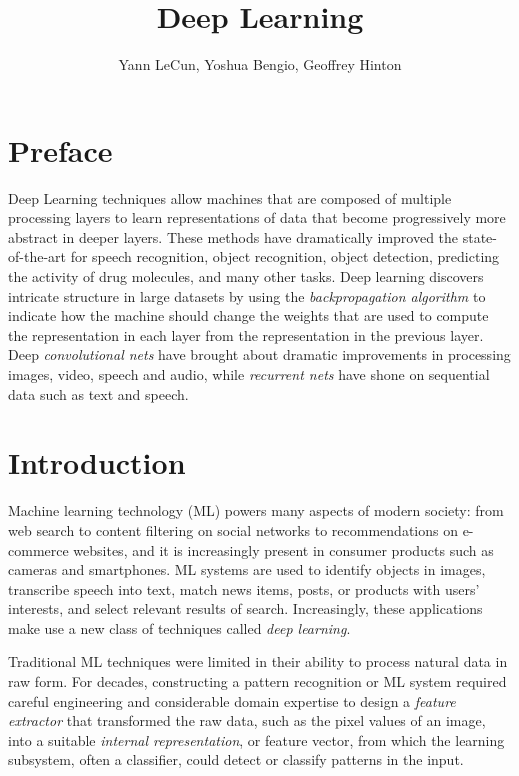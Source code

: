 \documentclass[10pts]{article}
\title{Deep Learning}
\author{Yann LeCun, Yoshua Bengio, Geoffrey Hinton}
\begin{document}
\maketitle

\section{Preface}

Deep Learning techniques allow machines that are composed of multiple processing layers
to learn representations of data that become progressively more abstract in deeper layers.
These methods have dramatically improved the state-of-the-art
for speech recognition, object recognition, object detection,
predicting the activity of drug molecules, and many other tasks. Deep
learning discovers intricate structure in large datasets by using the
{\em backpropagation algorithm} to indicate how the machine should
change the weights that are used to compute the representation in each layer from
the representation in the previous layer.  Deep {\em convolutional nets}
have brought about dramatic improvements in processing
images, video, speech and audio, while {\em recurrent
  nets} have shone on sequential data such as text and
speech.

\section{Introduction}

Machine learning technology (ML) powers many aspects of modern
society: from web search to content filtering on social networks 
to recommendations on e-commerce websites, and it is increasingly
present in consumer products such as cameras and smartphones. ML
systems are used to identify objects in images, transcribe speech into
text, match news items, posts, or products with users' interests, and
select relevant results of search. Increasingly, these applications
make use a new class of techniques called {\em deep learning}.

Traditional ML techniques were limited in their ability to process
natural data in raw form. For decades, constructing a pattern
recognition or ML system required careful engineering and considerable
domain
expertise to design a {\em feature extractor} that transformed the raw
data, such as the pixel values of an image, into a suitable {\em
  internal representation}, or feature vector, from which the learning
subsystem, often a classifier, could detect or classify
patterns in the input.
\end{document}
